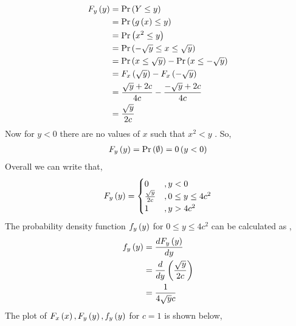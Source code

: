 \documentclass[journal,12pt,twocolumn]{IEEEtran}
\begin{document}
                     \begin{align}
                              F_{y}\left(y\right) &= \Pr\left(Y \leq y\right)\\
                                                   &= \Pr\left(g\left(x\right) \leq y\right)\\
                                                   &= \Pr\left(x^2 \leq y\right)\\
                                                   &= \Pr\left(-\sqrt{y} \leq x \leq \sqrt{y}\right) \\
                                                   & = \Pr\left( x \leq \sqrt{y}\right) - \Pr\left( x \leq -\sqrt{y}\right) \\
                                                   & = F_{x}\left(\sqrt{y}\right) - F_{x}\left(-\sqrt{y}\right) \\
                                                   & = \frac{\sqrt{y} +2c}{4c} - \frac{-\sqrt{y} +2c}{4c} \\
                                                   & = \frac{\sqrt{y}}{2c}
                      \end{align}
               Now for $ y < 0 $ there are no values of $x$ such that $ x^2 < y $ . So,
                              \begin{align}
                                     F_{y}\left(y\right) = \Pr\left(\emptyset\right) = 0 \left(y<0\right)
                               \end{align}
            Overall we can write that,
                      \begin{equation*}
                               F_{y}\left(y\right) = \begin{cases}
                                                          0  &, y < 0 \\
                                                         \frac{\sqrt{y}}{2c} &, 0\leq y \leq 4c^2 \\
                                                         1  & , y > 4c^2
                                                        \end{cases}
                      \end{equation*}
             The probability density function $f_{y}\left(y\right)$ for $ 0 \leq y \leq 4c^2 $ can be calculated as ,
                     \begin{align}
                                  f_{y}\left(y\right) &= \frac{dF_{y}\left(y\right)}{dy}\\
                                                       &= \frac{d}{dy}\left(\frac{\sqrt{y}}{2c}\right) \\
                                                       & = \frac{1}{4\sqrt{y}c}
                      \end{align}
   The plot of $ F_{x}\left(x\right) ,F_{y}\left(y\right),f_{y}\left(y\right)$ for $c=1$ is shown below,
\end{document}
